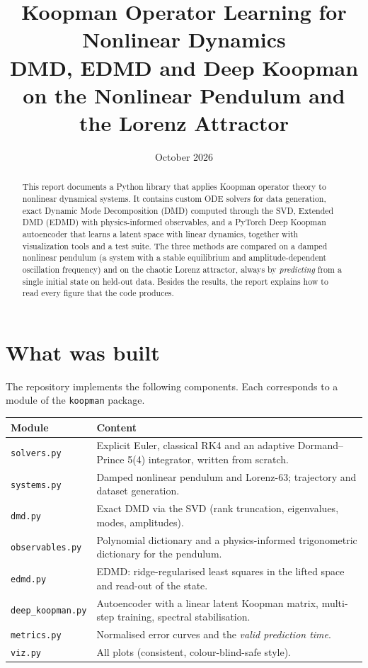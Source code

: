 \documentclass[11pt,a4paper]{article}
\title{\textbf{Koopman Operator Learning for Nonlinear Dynamics}\\[0.3em]
\large DMD, EDMD and Deep Koopman on the Nonlinear Pendulum and the Lorenz Attractor}
\author{}
\date{October 2026}
\newcommand{\code}[1]{\texttt{#1}}
\begin{document}
\maketitle

\begin{abstract}
\noindent
This report documents a Python library that applies Koopman operator theory to nonlinear dynamical
systems. It contains custom ODE solvers for data generation, exact Dynamic Mode Decomposition (DMD)
computed through the SVD, Extended DMD (EDMD) with physics-informed observables, and a PyTorch Deep
Koopman autoencoder that learns a latent space with linear dynamics, together with visualization
tools and a test suite. The three methods are compared on a damped nonlinear pendulum (a system
with a stable equilibrium and amplitude-dependent oscillation frequency) and on the chaotic Lorenz
attractor, always by \emph{predicting} from a single initial state on held-out data. Besides the
results, the report explains how to read every figure that the code produces.
\end{abstract}

\tableofcontents
\newpage

\section{What was built}
The repository implements the following components. Each corresponds to a module of the
\code{koopman} package.

\begin{center}
\small
\begin{tabular}{@{}lp{9.2cm}@{}}
\toprule
\textbf{Module} & \textbf{Content}\\
\midrule
\code{solvers.py} & Explicit Euler, classical RK4 and an adaptive Dormand--Prince 5(4) integrator, written from scratch.\\
\code{systems.py} & Damped nonlinear pendulum and Lorenz-63; trajectory and dataset generation.\\
\code{dmd.py} & Exact DMD via the SVD (rank truncation, eigenvalues, modes, amplitudes).\\
\code{observables.py} & Polynomial dictionary and a physics-informed trigonometric dictionary for the pendulum.\\
\code{edmd.py} & EDMD: ridge-regularised least squares in the lifted space and read-out of the state.\\
\code{deep\_koopman.py} & Autoencoder with a linear latent Koopman matrix, multi-step training, spectral stabilisation.\\
\code{metrics.py} & Normalised error curves and the \emph{valid prediction time}.\\
\code{viz.py} & All plots (consistent, colour-blind-safe style).\\
\bottomrule
\end{tabular}
\end{center}
\end{document}
